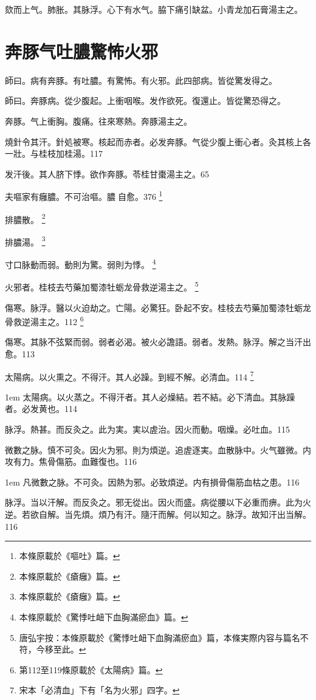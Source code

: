 欬而上气。肺胀。其脉浮。心下有水气。脇下痛引缺盆。小青龙加石膏湯主之。

\chapter{奔豚气吐膿驚怖火邪}

師曰。病有奔豚。有吐膿。有驚怖。有火邪。此四部病。皆從驚发得之。

師曰。奔豚病。從少腹起。上衝咽喉。发作欲死。復還止。皆從驚恐得之。

奔豚。气上衝胸。腹痛。往來寒熱。奔豚湯主之。

燒針令其汗。針処被寒。核起而赤者。必发奔豚。气從少腹上衝心者。灸其核上各一壯。与桂枝加桂湯。117

发汗後。其人脐下悸。欲作奔豚。苓桂甘棗湯主之。65

夫嘔家有癰膿。不可治嘔。膿{\sungtpii 𥁞}自愈。376
	\footnote{本條原載於《嘔吐》篇。}

排膿散。
	\footnote{本條原載於《瘡癰》篇。}

排膿湯。
	\footnote{本條原載於《瘡癰》篇。}

寸口脉動而弱。動則为驚。弱則为悸。
	\footnote{本條原載於《驚悸吐衄下血胸滿瘀血》篇。}

火邪者。桂枝去芍藥加蜀漆牡蛎龙骨救逆湯主之。
	\footnote{唐弘宇按：本條原載於《驚悸吐衄下血胸滿瘀血》篇，本條実際内容与篇名不符，今移至此。}

傷寒。脉浮。醫以火迫劫之。亡陽。{\khaaitp 必}驚狂。卧起不安。桂枝去芍藥加蜀漆牡蛎龙骨救逆湯主之。112
	\footnote{第112至119條原載於《太陽病》篇。}

傷寒。其脉不弦緊而弱{\khaaitp 。弱}者必渴。被火必譫語。{\khaaitp 弱者。发熱。脉浮。解之当汗出愈。}113

太陽病。以火熏之。不得汗。其人必躁。到經不解。必清血。114
	\footnote{宋本「必清血」下有「名为火邪」四字。}
	
\hangindent 1em
太陽病。以火蒸之。不得汗者。其人必燥結。若不結。必下清血。其脉躁者。必发黄也。{\gaoben}114

脉浮。熱甚。而反灸之。此为実。実以虗治。因火而動。咽燥。必吐血。115

微數之脉。慎不可灸。因火为邪。則为煩逆。追虗逐実。血散脉中。火气雖微。内攻有力。焦骨傷筋。血難復也。116

\hangindent 1em
凡微數之脉。不可灸。因熱为邪。必致煩逆。内有損骨傷筋血枯之患。{\gaoben}116

脉浮。当以汗解。而反灸之。邪无從出。因火而盛。病從腰以下必重而痹。此为火逆。若欲自解。当先煩。煩乃有汗。隨汗而解。何以知之。脉浮。故知汗出当解。116

